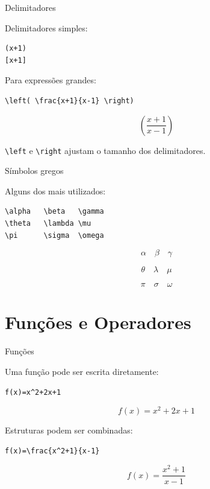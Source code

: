 \documentclass[aspectratio=169,xcolor=dvipsnames]{beamer}
\begin{document}
\begin{frame}[fragile]{Delimitadores}

    Delimitadores simples:

\begin{lstlisting}
(x+1)
[x+1]
\end{lstlisting}

    Para expressões grandes:

\begin{lstlisting}
\left( \frac{x+1}{x-1} \right)
\end{lstlisting}

    \[
        \left(
        \frac{x+1}{x-1}
        \right)
    \]

    \begin{center}
        \texttt{\textbackslash left} e \texttt{\textbackslash right}
        ajustam o tamanho dos delimitadores.
    \end{center}

\end{frame}

\begin{frame}[fragile]{Símbolos gregos}

    Alguns dos mais utilizados:

\begin{lstlisting}
\alpha   \beta   \gamma
\theta   \lambda \mu
\pi      \sigma  \omega
\end{lstlisting}

    \[
        \alpha \quad \beta \quad \gamma
    \]

    \[
        \theta \quad \lambda \quad \mu
    \]

    \[
        \pi \quad \sigma \quad \omega
    \]

\end{frame}


\section{Funções e Operadores}

\begin{frame}[fragile]{Funções}

    Uma função pode ser escrita diretamente:

\begin{lstlisting}
f(x)=x^2+2x+1
\end{lstlisting}

    \[
        f(x)=x^2+2x+1
    \]

    Estruturas podem ser combinadas:

\begin{lstlisting}
f(x)=\frac{x^2+1}{x-1}
\end{lstlisting}

    \[
        f(x)=\frac{x^2+1}{x-1}
    \]

\end{frame}
\end{document}
